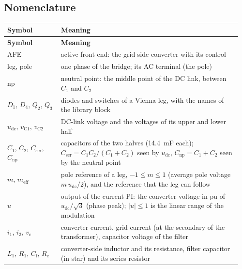 \documentclass[11pt,a4paper]{scrartcl}
\newcommand{\ped}[1]{_{\mathrm{#1}}}
\begin{document}


\tableofcontents
\listoffigures
\listoftables
\newpage

\begin{onehalfspace}

\section*{Nomenclature}
\label{sec:nomenclature}

\begingroup
{}
\begin{longtable}{@{} >{\raggedright\arraybackslash}p{0.22\linewidth} p{0.74\linewidth} @{}}
	\toprule
	\textbf{Symbol} & \textbf{Meaning} \\
	\midrule
	\endfirsthead
	\toprule
	\textbf{Symbol} & \textbf{Meaning} \\
	\midrule
	\endhead
	\bottomrule
	\endfoot
	\bottomrule
	\endlastfoot
	AFE & active front end: the grid-side converter with its control \\
	leg, pole & one phase of the bridge; its AC terminal (the pole) \\
	np & neutral point: the middle point of the DC link, between $C_1$ and $C_2$ \\
	$D_1$, $D_4$, $Q_2$, $Q_3$ & diodes and switches of a Vienna leg, with the names of the library block \\
	$u\ped{dc}$, $v\ped{C1}$, $v\ped{C2}$ & DC-link voltage and the voltages of its upper and lower half \\
	$C_1$, $C_2$, $C\ped{ser}$, $C\ped{np}$ & capacitors of the two halves (\SI{14.4}{\milli\farad} each); $C\ped{ser} = C_1 C_2/(C_1 + C_2)$ seen by $u\ped{dc}$, $C\ped{np} = C_1 + C_2$ seen by the neutral point \\
	$m$, $m\ped{eff}$ & pole reference of a leg, $-1 \le m \le 1$ (average pole voltage $m\, u\ped{dc}/2$), and the reference that the leg can follow \\
	$u$ & output of the current PI: the converter voltage in pu of $u\ped{dc}/\sqrt3$ (phase peak); $|u| \le 1$ is the linear range of the modulation \\
	$i_1$, $i_2$, $v\ped{c}$ & converter current, grid current (at the secondary of the transformer), capacitor voltage of the filter \\
	$L_1$, $R_1$, $C\ped{f}$, $R\ped{c}$ & converter-side inductor and its resistance, filter capacitor (in star) and its series resistor \\

\end{longtable}
\end{onehalfspace}
\end{document}
